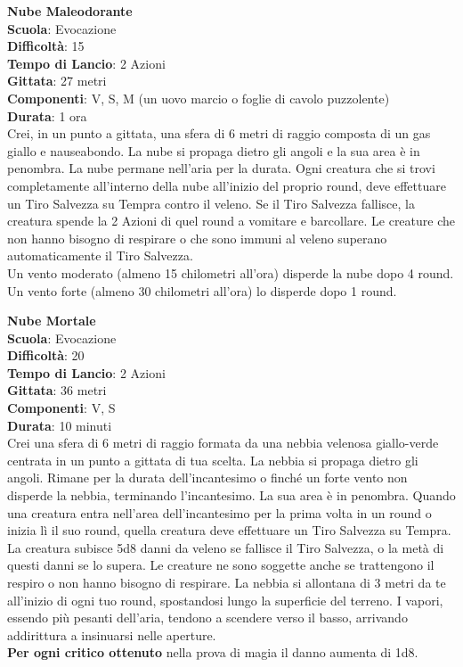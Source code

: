\begin{multicols}{2}
\medskip\textbf{Nube Maleodorante}\\
\textbf{Scuola}: Evocazione\\
\textbf{Difficoltà}: 15\\
\textbf{Tempo di Lancio}: 2 Azioni\\
\textbf{Gittata}: 27 metri\\
\textbf{Componenti}: V, S, M (un uovo marcio o foglie di cavolo puzzolente)\\
\textbf{Durata}: 1 ora\\
Crei, in un punto a gittata, una sfera di 6 metri di raggio composta di un gas giallo e nauseabondo. La nube si propaga dietro gli angoli e la sua area è in penombra. La nube permane nell'aria per la durata. Ogni creatura che si trovi completamente all'interno della nube all'inizio del proprio round, deve effettuare un Tiro Salvezza su Tempra contro il veleno. Se il Tiro Salvezza fallisce, la creatura spende la 2 Azioni di quel round a vomitare e barcollare. Le creature che non hanno bisogno di respirare o che sono immuni al veleno superano automaticamente il Tiro Salvezza.\\
Un vento moderato (almeno 15 chilometri all'ora) disperde la nube dopo 4 round. Un vento forte (almeno 30 chilometri all'ora) lo disperde dopo 1 round.

\medskip\textbf{Nube Mortale}\\
\textbf{Scuola}: Evocazione\\
\textbf{Difficoltà}: 20\\
\textbf{Tempo di Lancio}: 2 Azioni\\
\textbf{Gittata}: 36 metri\\
\textbf{Componenti}: V, S\\
\textbf{Durata}: 10 minuti \\
Crei una sfera di 6 metri di raggio formata da una nebbia velenosa giallo-verde centrata in un punto a gittata di tua scelta. La nebbia si propaga dietro gli angoli. Rimane per la durata dell'incantesimo o finché un forte vento non disperde la nebbia, terminando l'incantesimo. La sua area è in penombra. Quando una creatura entra nell'area dell'incantesimo per la prima volta in un round o inizia lì il suo round, quella creatura deve effettuare un Tiro Salvezza su Tempra. La creatura subisce 5d8 danni da veleno se fallisce il Tiro Salvezza, o la metà di questi danni se lo supera. Le creature ne sono soggette anche se trattengono il respiro o non hanno bisogno di respirare. La nebbia si allontana di 3 metri da te all'inizio di ogni tuo round, spostandosi lungo la superficie del terreno. I vapori, essendo più pesanti dell'aria, tendono a scendere verso il basso, arrivando addirittura a insinuarsi nelle aperture.\\
\textbf{Per ogni critico ottenuto} nella prova di magia il danno aumenta di 1d8.


\end{multicols}

